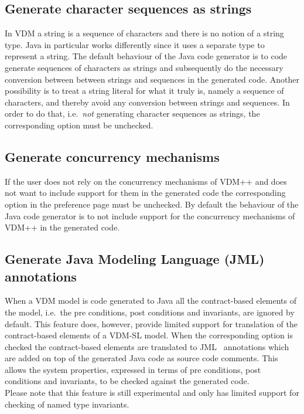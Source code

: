 \subsection{Generate character sequences as strings}

In VDM a string is a sequence of characters and there is no notion of
a string type. Java in particular works differently since it uses a
separate type to represent a string. The default behaviour of the Java
code generator is to code generate sequences of characters as strings
and subsequently do the necessary conversion between between strings
and sequences in the generated code. Another possibility is to treat a
string literal for what it truly is, namely a sequence of characters,
and thereby avoid any conversion between strings and sequences. In
order to do that, i.e.\ \textit{not} generating character sequences as
strings, the corresponding option must be unchecked.

\subsection{Generate concurrency mechanisms}

If the user does not rely on the concurrency mechanisms of VDM++ and
does not want to include support for them in the generated code the
corresponding option in the preference page must be unchecked. By
default the behaviour of the Java code generator is to not include
support for the concurrency mechanisms of VDM++ in the generated code.

\subsection{Generate Java Modeling Language (JML) annotations}

When a VDM model is code generated to Java all the contract-based
elements of the model, i.e.\ the pre conditions, post conditions and
invariants, are ignored by default. This feature does, however,
provide limited support for translation of the contract-based elements
of a VDM-SL model. When the corresponding option is checked the
contract-based elements are translated to JML~\cite{Burdy&05}
annotations which are added on top of the generated Java code as
source code comments. This allows the system properties, expressed in
terms of pre conditions, post conditions and invariants, to be checked
against the generated code.\\

\noindent Please note that this feature is still experimental and only
has limited support for checking of named type invariants.

